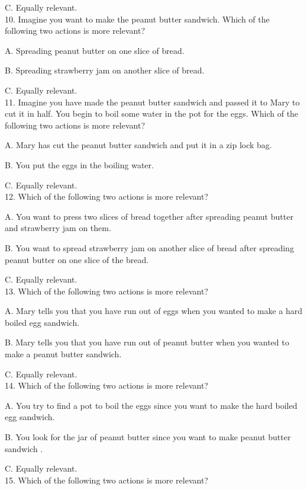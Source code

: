 \documentclass[12pt]{report}
\begin{document}
\begin{appendices}
C. Equally relevant.\\


10. Imagine you want to make the peanut butter sandwich. Which of the following two actions is more relevant?

A. Spreading peanut butter on one slice of bread.

B. Spreading strawberry jam on another slice of bread.

C. Equally relevant.\\


11. Imagine you have made the peanut butter sandwich and passed it to Mary to cut it in half. You begin to boil some water in the pot for the eggs. Which of the following two actions is more relevant? 

A. Mary has cut the peanut butter sandwich and put it in a zip lock bag.

B. You put the eggs in the boiling water.

C. Equally relevant.\\


12. Which of the following two actions is more relevant? 

A. You want to press two slices of bread together after spreading peanut butter and strawberry jam on them. 

B. You want to spread strawberry jam on another slice of bread after spreading peanut butter on one slice of the bread.

C. Equally relevant.\\


13. Which of the following two actions is more relevant? 

A. Mary tells you that you have run out of eggs when you wanted to make a hard boiled egg sandwich.

B. Mary tells you that you have run out of peanut butter when you wanted to make a peanut butter sandwich.

C. Equally relevant.\\


14. Which of the following two actions is more relevant?

A. You try to find a pot to boil the eggs since you want to make the hard boiled egg sandwich. 

B. You look for the jar of peanut butter since you want to make peanut butter sandwich .

C. Equally relevant.\\


15. Which of the following two actions is more relevant?


\end{appendices}
\end{document}

